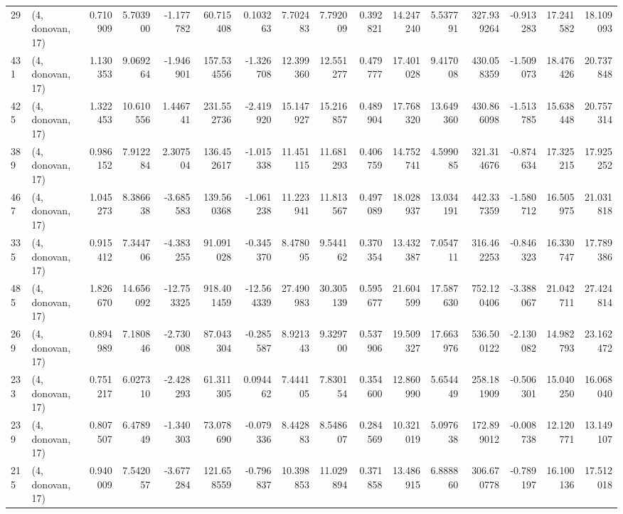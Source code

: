 \begin{tabular}{llrrrrrrrrrrrrrr}
29  &  (4, donovan, 17) &   0.710909 &   5.703900 &  -1.177782 &    60.715408 &   0.103263 &   7.702483 &   7.792009 &  0.392821 &  14.247240 &   5.537791 &   327.939264 & -0.913283 &  17.241582 &  18.109093 \\
431 &  (4, donovan, 17) &   1.130353 &   9.069264 &  -1.946901 &   157.534556 &  -1.326708 &  12.399360 &  12.551277 &  0.479777 &  17.401028 &   9.417008 &   430.058359 & -1.509073 &  18.476426 &  20.737848 \\
425 &  (4, donovan, 17) &   1.322453 &  10.610556 &   1.446741 &   231.552736 &  -2.419920 &  15.147927 &  15.216857 &  0.489904 &  17.768320 &  13.649360 &   430.866098 & -1.513785 &  15.638448 &  20.757314 \\
389 &  (4, donovan, 17) &   0.986152 &   7.912284 &   2.307504 &   136.452617 &  -1.015338 &  11.451115 &  11.681293 &  0.406759 &  14.752741 &   4.599085 &   321.314676 & -0.874634 &  17.325215 &  17.925252 \\
467 &  (4, donovan, 17) &   1.045273 &   8.386638 &  -3.685583 &   139.560368 &  -1.061238 &  11.223941 &  11.813567 &  0.497089 &  18.028937 &  13.034191 &   442.337359 & -1.580712 &  16.505975 &  21.031818 \\
335 &  (4, donovan, 17) &   0.915412 &   7.344706 &  -4.383255 &    91.091028 &  -0.345370 &   8.478095 &   9.544162 &  0.370354 &  13.432387 &   7.054711 &   316.462253 & -0.846323 &  16.330747 &  17.789386 \\
485 &  (4, donovan, 17) &   1.826670 &  14.656092 & -12.753325 &   918.401459 & -12.564339 &  27.490983 &  30.305139 &  0.595677 &  21.604599 &  17.587630 &   752.120406 & -3.388067 &  21.042711 &  27.424814 \\
269 &  (4, donovan, 17) &   0.894989 &   7.180846 &  -2.730008 &    87.043304 &  -0.285587 &   8.921343 &   9.329700 &  0.537906 &  19.509327 &  17.663976 &   536.500122 & -2.130082 &  14.982793 &  23.162472 \\
233 &  (4, donovan, 17) &   0.751217 &   6.027310 &  -2.428293 &    61.311305 &   0.094462 &   7.444105 &   7.830154 &  0.354600 &  12.860990 &   5.654449 &   258.181909 & -0.506301 &  15.040250 &  16.068040 \\
239 &  (4, donovan, 17) &   0.807507 &   6.478949 &  -1.340303 &    73.078690 &  -0.079336 &   8.442883 &   8.548607 &  0.284569 &  10.321019 &   5.097638 &   172.899012 & -0.008738 &  12.120771 &  13.149107 \\
215 &  (4, donovan, 17) &   0.940009 &   7.542057 &  -3.677284 &   121.658559 &  -0.796837 &  10.398853 &  11.029894 &  0.371858 &  13.486915 &   6.888860 &   306.670778 & -0.789197 &  16.100136 &  17.512018 \\

\end{tabular}
